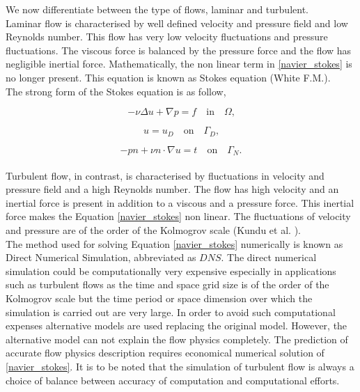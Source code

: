 \documentclass[a4paper,twoside,openright]{book}
\begin{document}
We now differentiate between the type of flows, laminar and turbulent.\\

Laminar flow is characterised by well defined velocity and pressure field and low Reynolds number. This flow has very low velocity fluctuations and pressure fluctuations. The viscous force is balanced by the pressure force and the flow has negligible inertial force. Mathematically, the non linear term in \eqref{navier_stokes} is no longer present. This equation is known as Stokes equation (White F.M.\cite{white}).\\

The strong form of the Stokes equation is as follow,

\begin{equation} \label{stokes_strong_form}
-\nu \Delta u + \nabla p = f \quad \textrm{in} \quad \Omega \textrm{,}
\end{equation}

\begin{equation} \label{dirichlet condition stokes}
u = u_D \quad \textrm{on} \quad \Gamma_D \textrm{,}
\end{equation}

\begin{equation} \label{neumann condition stokes}
-pn + \nu n \cdot \nabla u = t \quad \textrm{on} \quad \Gamma_N \textrm{.}
\end{equation}
\\

Turbulent flow, in contrast, is characterised by fluctuations in velocity and pressure field and a high Reynolds number. The flow has high velocity and an inertial force is present in addition to a viscous and a pressure force. This inertial force makes the Equation \eqref{navier_stokes} non linear. The fluctuations of velocity and pressure are of the order of the Kolmogrov scale (Kundu et al. \cite{Kundu}).\\

The method used for solving Equation \eqref{navier_stokes} numerically is known as Direct Numerical Simulation, abbreviated as $DNS$. The direct numerical simulation could be computationally very expensive especially in applications such as turbulent flows as the time and space grid size is of the order of the Kolmogrov scale but the time period or space dimension over which the simulation is carried out are very large. In order to avoid such computational expenses alternative models are used replacing the original model. However, the alternative model can not explain the flow physics completely. The prediction of accurate flow physics description requires economical numerical solution of \eqref{navier_stokes}. It is to be noted that the simulation of turbulent flow is always a choice of balance between accuracy of computation and computational efforts.
\end{document}
